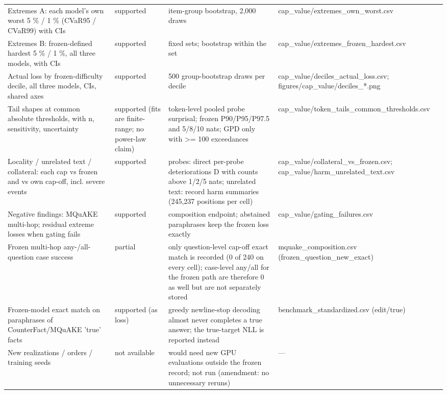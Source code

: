 \documentclass[10pt,a4paper]{article}
\begin{document}
\begin{center}
\begin{tabularx}{\textwidth}{@{}p{}XXX@{}}
Extremes A: each model's own worst 5 \% / 1 \% (CVaR95 / CVaR99) with CIs & supported & item-group bootstrap, 2,000 draws & cap\_value/extremes\_own\_worst.csv \\
Extremes B: frozen-defined hardest 5 \% / 1 \%, all three models, with CIs & supported & fixed sets; bootstrap within the set & cap\_value/extremes\_frozen\_hardest.csv \\
Actual loss by frozen-difficulty decile, all three models, CIs, shared axes & supported & 500 group-bootstrap draws per decile & cap\_value/deciles\_actual\_loss.csv; figures/cap\_value/deciles\_*.png \\
Tail shapes at common absolute thresholds, with n, sensitivity, uncertainty & supported (fits are finite-range; no power-law claim) & token-level pooled probe surprisal; frozen P90/P95/P97.5 and 5/8/10 nats; GPD only with >= 100 exceedances & cap\_value/token\_tails\_common\_thresholds.csv \\
Locality / unrelated text / collateral: each cap vs frozen and vs own cap-off, incl. severe events & supported & probes: direct per-probe deteriorations D with counts above 1/2/5 nats; unrelated text: record harm summaries (245,237 positions per cell) & cap\_value/collateral\_vs\_frozen.csv; cap\_value/harm\_unrelated\_text.csv \\
Negative findings: MQuAKE multi-hop; residual extreme losses when gating fails & supported & composition endpoint; abstained paraphrases keep the frozen loss exactly & cap\_value/gating\_failures.csv \\
Frozen multi-hop any-/all-question case success & partial & only question-level cap-off exact match is recorded (0 of 240 on every cell); case-level any/all for the frozen path are therefore 0 as well but are not separately stored & mquake\_composition.csv (frozen\_question\_new\_exact) \\
Frozen-model exact match on paraphrases of CounterFact/MQuAKE 'true' facts & supported (as loss) & greedy newline-stop decoding almost never completes a true answer; the true-target NLL is reported instead & benchmark\_standardized.csv (edit/true) \\
New realizations / orders / training seeds & not available & would need new GPU evaluations outside the frozen record; not run (amendment: no unnecessary reruns) & — \\
\bottomrule
\end{tabularx}
\end{center}
\end{document}
